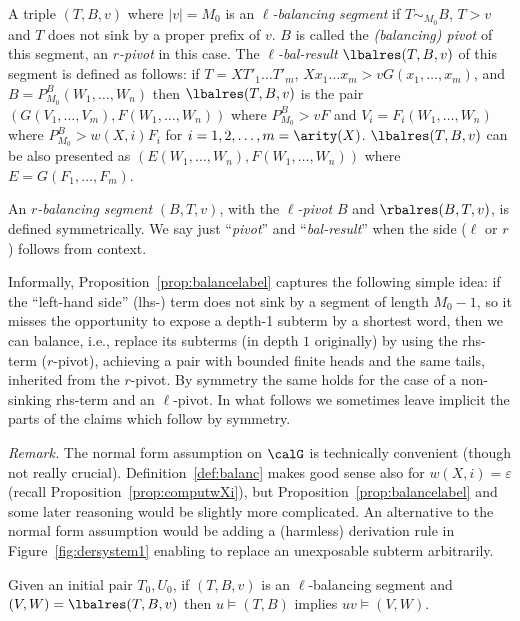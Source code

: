 \documentclass[12pt]{article}
\begin{document}
\begin{defn}\label{def:balanc}
A triple $(T,B,v)$ where $|v|=M_0$ is an \emph{$\ell$-balancing
segment} if $T\sim_{M_0}B$, $T\gt{v}$ and 
$T$ does not sink by a proper prefix of $v$. $B$ is called the
\emph{(balancing) pivot} of this segment, an \emph{$r$-pivot}
in this case. 
The \emph{$\ell$-bal-result}  $\lbalres(T,B,v)$
of this segment 
is defined
as follows: if $T=XT'_1\dots T'_m$,
$Xx_1\dots x_m\gt{v}G(x_1,\dots, x_m)$, and 
$B=P^{B}_{M_0}(W_1,\dots,W_n)$ then 
$\lbalres(T,B,v)$ is the pair $(G(V_1,\dots,V_m),F(W_1,\dots,W_n))$ where
$P^{B}_{M_0}\gt{v}F$  
and
$V_i=F_i(W_1,\dots,W_n)$ where $P^{B}_{M_0}\gt{w(X,i)}F_i$
for $i=1,2,\dots, m=\arity(X)$.
$\lbalres(T,B,v)$
can be also presented as 
$(E(W_1,\dots,W_n),F(W_1,\dots,W_n))$ where
$E=G(F_1,\dots,F_m)$.

An \emph{$r$-balancing segment} $(B,T,v)$, with the \emph{$\ell$-pivot} $B$
and $\rbalres(B,T,v)$, is
defined symmetrically. We say just ``\emph{pivot}'' and
``\emph{bal-result}'' when
the side ($\ell$ or $r$) follows from context.
\end{defn}
Informally, Proposition~\ref{prop:balancelabel} 
captures the following simple idea:
if the ``left-hand side'' (lhs-) term does not sink 
by a segment of length
$M_0{-}1$, so it misses the opportunity to expose
a depth-1 subterm by a shortest word, 
then we can balance, i.e., replace its subterms (in depth $1$
originally) by using the
rhs-term ($r$-pivot), achieving
a pair with bounded finite heads and the
same tails, inherited from the $r$-pivot.
By symmetry the same holds for the case of
a non-sinking rhs-term and an $\ell$-pivot.
In what follows we sometimes 
leave implicit the parts of the claims which follow by
symmetry. 

\emph{Remark.}
The normal form assumption on $\calG$ is technically convenient
(though not really crucial). 
Definition~\ref{def:balanc} makes good sense also for
$w(X,i)=\varepsilon$ (recall Proposition~\ref{prop:computwXi}),
but Proposition~\ref{prop:balancelabel} and some later reasoning
would be slightly more complicated. An alternative to the normal
form assumption would 
be adding
a (harmless)
derivation rule in Figure~\ref{fig:dersystem1} 
enabling to replace
an unexposable subterm arbitrarily.


\begin{prop}\label{prop:balancelabel}
Given 
an initial pair $T_0,U_0$,
if $(T,B,v)$ is an $\ell$-balancing segment and
$(V,W)=\lbalres(T,B,v)$ then 
$u\models(T,B)$ implies
$uv\models (V,W)$. 
\end{prop}
\end{document}
